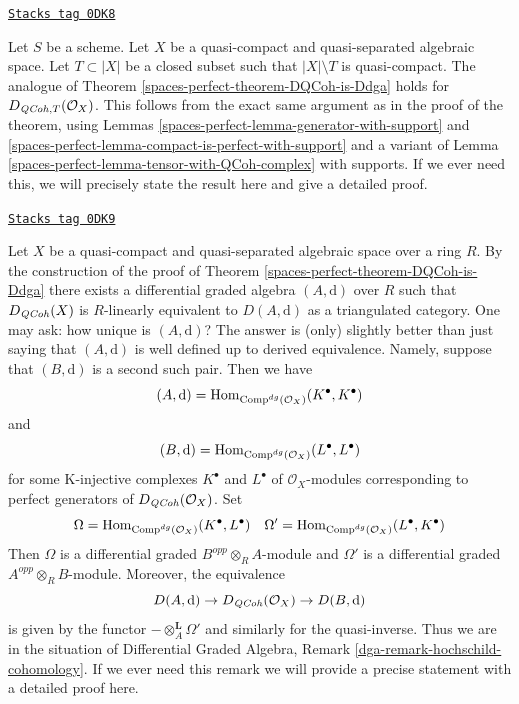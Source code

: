 \begin{remark}

\label{spaces-perfect-remark-DQCoh-is-Ddga-with-support}
\href{https://stacks.math.columbia.edu/tag/0DK8}{\texttt{Stacks tag 0DK8}}

Let $S$ be a scheme.
Let $X$ be a quasi-compact and quasi-separated algebraic space.
Let $T \subset |X|$ be a closed subset such that
$|X| \setminus T$ is quasi-compact.
The analogue of Theorem \ref{spaces-perfect-theorem-DQCoh-is-Ddga} holds
for $D_{\mathit{QCoh}, T}(\mathcal{O}_X)$.
This follows from the exact same argument as in the proof
of the theorem, using
Lemmas \ref{spaces-perfect-lemma-generator-with-support} and
\ref{spaces-perfect-lemma-compact-is-perfect-with-support}
and a variant of Lemma \ref{spaces-perfect-lemma-tensor-with-QCoh-complex}
with supports.
If we ever need this, we will precisely state the
result here and give a detailed proof.
\end{remark}

\begin{remark}

\label{spaces-perfect-remark-independence-choice}
\href{https://stacks.math.columbia.edu/tag/0DK9}{\texttt{Stacks tag 0DK9}}

Let $X$ be a quasi-compact and quasi-separated algebraic space over a ring $R$.
By the construction of the proof of
Theorem \ref{spaces-perfect-theorem-DQCoh-is-Ddga}
there exists a differential graded algebra $(A, \text{d})$ over $R$
such that $D_{\mathit{QCoh}}(X)$ is $R$-linearly equivalent to
$D(A, \text{d})$ as a triangulated category.
One may ask: how unique is $(A, \text{d})$?
The answer is (only) slightly better than just saying that
$(A, \text{d})$ is well defined up to derived equivalence.
Namely, suppose that $(B, \text{d})$ is a second such pair.
Then we have
$$
(A, \text{d}) = \operatorname{Hom}_{\text{Comp}^{dg}(\mathcal{O}_X)}(K^\bullet, K^\bullet)
$$
and
$$
(B, \text{d}) = \operatorname{Hom}_{\text{Comp}^{dg}(\mathcal{O}_X)}(L^\bullet, L^\bullet)
$$
for some K-injective complexes $K^\bullet$ and $L^\bullet$
of $\mathcal{O}_X$-modules corresponding to perfect generators
of $D_{\mathit{QCoh}}(\mathcal{O}_X)$. Set
$$
\Omega = \operatorname{Hom}_{\text{Comp}^{dg}(\mathcal{O}_X)}(K^\bullet, L^\bullet)
\quad
\Omega' = \operatorname{Hom}_{\text{Comp}^{dg}(\mathcal{O}_X)}(L^\bullet, K^\bullet)
$$
Then $\Omega$ is a differential graded $B^{opp} \otimes_R A$-module
and $\Omega'$ is a differential graded $A^{opp} \otimes_R B$-module.
Moreover, the equivalence
$$
D(A, \text{d}) \to D_{\mathit{QCoh}}(\mathcal{O}_X) \to
D(B, \text{d})
$$
is given by the functor $- \otimes_A^\mathbf{L} \Omega'$ and
similarly for the quasi-inverse. Thus we are in the situation
of Differential Graded Algebra, Remark \ref{dga-remark-hochschild-cohomology}.
If we ever need this remark we will provide a precise statement
with a detailed proof here.
\end{remark}

